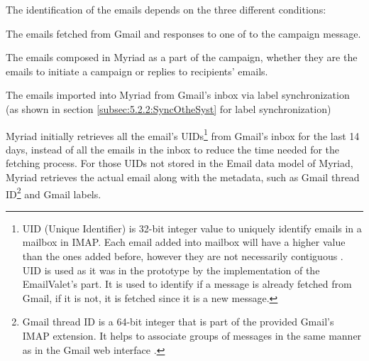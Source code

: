 The identification of the emails depends on the three different conditions:

\begin{compactenum}
	\item The emails fetched from Gmail and responses to one of to the campaign message.
	\item The emails composed in Myriad as a part of the campaign, whether they are the emails to initiate a campaign or replies to recipients' emails.
	\item The emails imported into Myriad from Gmail's inbox via label synchronization (as shown in section \ref{subsec:5.2.2:SyncOtheSyst} for label synchronization)
\end{compactenum}

Myriad initially retrieves all the email's \ac{UID}s\footnote{UID (Unique Identifier) is 32-bit integer value to uniquely identify emails in a mailbox in \ac{IMAP}. Each email added into mailbox will have a higher value than the ones added before, however they are not necessarily contiguous \citep{rfc3501}. \ac{UID} is used as it was in the prototype by the implementation of the EmailValet's part. It is used to identify if a message is already fetched from Gmail, if it is not, it is fetched since it is a new message.} from Gmail's inbox for the last 14 days, instead of all the emails in the inbox to reduce the time needed for the fetching process. For those \ac{UID}s not stored in the Email data model of Myriad, Myriad retrieves the actual email along with the metadata, such as Gmail thread ID\footnote{Gmail thread ID is a 64-bit integer that is part of the provided Gmail's IMAP extension. It helps to associate groups of messages in the same manner as in the Gmail web interface \citep{GoogleInc.2013a}.} and Gmail labels.
\vspace{1cm}

